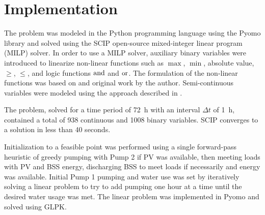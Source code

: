 \section{Implementation}
\label{sec:implementation}

The problem was modeled in the Python programming language using the Pyomo library\cite{hart2011pyomo,bynum2021pyomo} and solved using
the SCIP\cite{Scip80}
open-source mixed-integer linear program (MILP) solver. In order to use a MILP solver, auxiliary binary variables were introduced to linearize non-linear functions such as $\max$, $\min$, absolute value, $\ge$, $\le$, and logic functions $\operatorname{and}$ and $\operatorname{or}$. The formulation of the non-linear functions was based on \cite{YALPMIP_logic} and original work by the author.
Semi-continuous variables were modeled using the approach described in \cite{MILP_handout}.

The problem, solved for a time period of \SI{72}{h} with an interval $\Delta t$ of \SI{1}{h}, contained a total of 938 continuous and 1008 binary variables. SCIP converges to a solution in less than 40 seconds.

Initialization to a feasible point was performed using a single forward-pass heuristic of greedy pumping with Pump 2 if PV was available, then meeting loads with PV and BSS energy, discharging BSS to meet loads if necessarily and energy was available. Initial Pump 1 pumping and water use was set by iteratively solving a linear problem to try to add pumping one hour at a time until the desired water usage was met. The linear problem was implemented in Pyomo and solved using GLPK\cite{GLPK}.